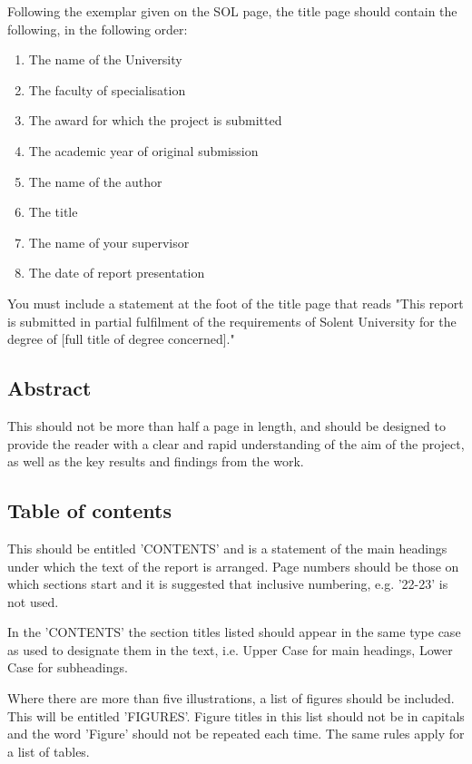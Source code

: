 Following the exemplar given on the SOL page, the title page should contain the following, in the following order:

\begin{enumerate}
    \item The name of the University
    \item The faculty of specialisation
    \item The award for which the project is submitted
    \item The academic year of original submission
    \item The name of the author
    \item The title
    \item The name of your supervisor
    \item The date of report presentation
\end{enumerate}

You must include a statement at the foot of the title page that reads "This report is submitted in partial fulfilment of the requirements of Solent University for the degree of [full title of degree concerned]."


\subsection{Abstract}

This should not be more than half a page in length, and should be designed to provide the reader with a clear and rapid understanding of the aim of the project, as well as the key results and findings from the work.

\subsection{Table of contents}

This should be entitled 'CONTENTS' and is a statement of the main headings under which the text of the report is arranged. Page numbers should be those on which sections start and it is suggested that inclusive numbering, e.g. '22-23' is not used.

In the 'CONTENTS' the section titles listed should appear in the same type case as used to designate them in the text, i.e. Upper Case for main headings, Lower Case for subheadings. 

Where there are more than five illustrations, a list of figures should be included. This will be entitled 'FIGURES'. Figure titles in this list should not be in capitals and the word 'Figure' should not be repeated each time. The same rules apply for a list of tables. 

